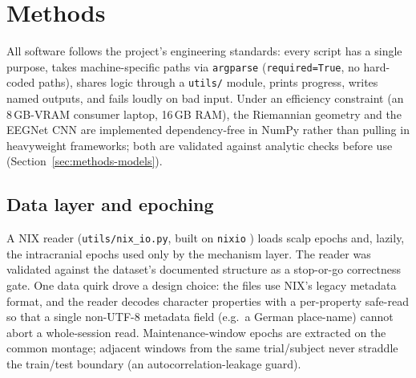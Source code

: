 \documentclass[11pt]{article}
\begin{document}
\section{Methods}
\label{sec:methods}

All software follows the project's engineering standards: every script has a single purpose,
takes machine-specific paths via \texttt{argparse} (\texttt{required=True}, no hard-coded paths),
shares logic through a \texttt{utils/} module, prints progress, writes named outputs, and fails
loudly on bad input. Under an efficiency constraint (an 8\,GB-VRAM consumer laptop, 16\,GB RAM),
the Riemannian geometry and the EEGNet CNN are implemented dependency-free in NumPy rather than
pulling in heavyweight frameworks; both are validated against analytic checks before use
(Section~\ref{sec:methods-models}).

\subsection{Data layer and epoching}
A NIX reader (\texttt{utils/nix\_io.py}, built on \texttt{nixio} \cite{nixio}) loads scalp epochs
and, lazily, the intracranial epochs used only by the mechanism layer. The reader was validated
against the dataset's documented structure as a stop-or-go correctness gate. One data quirk drove
a design choice: the files use NIX's legacy metadata format, and the reader decodes character
properties with a per-property safe-read so that a single non-UTF-8 metadata field (e.g.\ a German
place-name) cannot abort a whole-session read. Maintenance-window epochs are extracted on the
common montage; adjacent windows from the same trial/subject never straddle the train/test
boundary (an autocorrelation-leakage guard).
\end{document}
